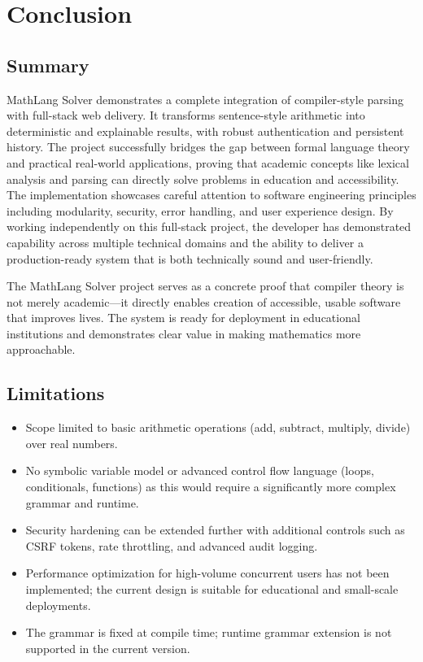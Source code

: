 \documentclass[12pt,a4paper]{report}
\begin{document}
\chapter{Conclusion}

\section{Summary}

MathLang Solver demonstrates a complete integration of compiler-style parsing with full-stack web delivery. It transforms sentence-style arithmetic into deterministic and explainable results,
with robust authentication and persistent history. The project successfully bridges the gap between formal language theory and practical
real-world applications, proving that academic concepts like lexical analysis and parsing can directly solve problems in education
and accessibility. The implementation showcases careful attention to software engineering principles including modularity, security,
error handling, and user experience design. By working independently on this full-stack project, the developer has demonstrated capability
across multiple technical domains and the ability to deliver a production-ready system that is both technically sound and user-friendly.

The MathLang Solver project serves as a concrete proof that compiler theory is not merely academic---it directly enables creation
of accessible, usable software that improves lives. The system is ready for deployment in educational institutions and demonstrates
clear value in making mathematics more approachable.

\section{Limitations}

\begin{itemize}
\item Scope limited to basic arithmetic operations (add, subtract, multiply, divide) over real numbers.
\item No symbolic variable model or advanced control flow language (loops, conditionals, functions) as this would require
a significantly more complex grammar and runtime.
\item Security hardening can be extended further with additional controls such as CSRF tokens, rate throttling, and
advanced audit logging.
\item Performance optimization for high-volume concurrent users has not been implemented; the current design is suitable
for educational and small-scale deployments.
\item The grammar is fixed at compile time; runtime grammar extension is not supported in the current version.
\end{itemize}
\end{document}
